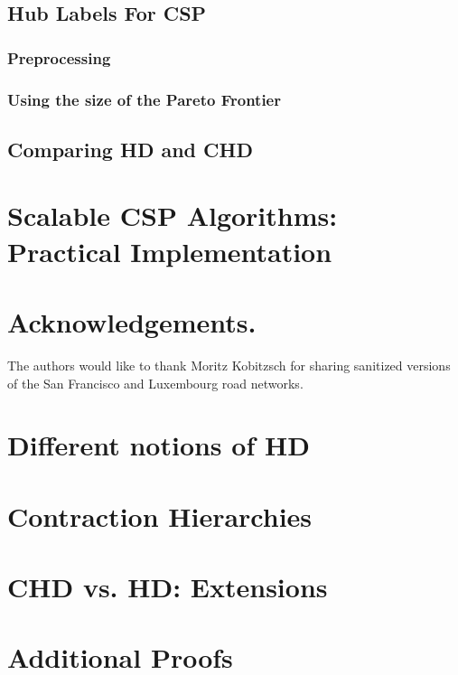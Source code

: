 \documentclass[format=acmsmall, review=false, screen=true]{acmart}
\begin{document}
\subsection{Hub Labels For CSP}
\label{ssec:hlcsp}


\subsubsection{Preprocessing}
\label{sec:preproc}


\subsubsection{Using the size of the Pareto Frontier}


\subsection{Comparing HD and CHD}
\label{ssec:hdvschd}


\section{Scalable CSP Algorithms: \texorpdfstring{\\}{ } Practical Implementation}
\label{sec:numeric}



\section*{Acknowledgements.}
The authors would like to thank Moritz Kobitzsch for sharing sanitized versions of the San Francisco and Luxembourg road networks.


\appendix
\section{Different notions of HD}
\label{app:generalhd}


\section{Contraction Hierarchies}


\section{CHD vs. HD: Extensions}
\label{app:extn}



\section{Additional Proofs}
\label{sec:proofs}




\end{document}
